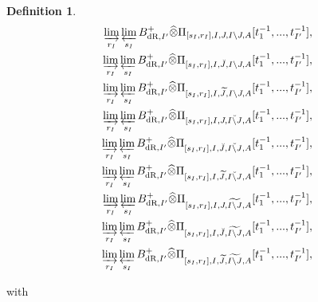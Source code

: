 \documentclass[12pt]{amsart}
\theoremstyle{definition}
\newtheorem{definition}[theorem]{Definition}
\numberwithin{equation}{section}
\begin{document}
\begin{definition}
\begin{align}
\varinjlim_{r_I}\varprojlim_{s_I} B^+_{\mathrm{dR},I'}	\widehat{\otimes}\Pi_{[s_I,r_I],I,J,I\backslash J,A}[t_1^{-1},...,t_{I'}^{-1}],\\	
\varinjlim_{r_I}\varprojlim_{s_I} B^+_{\mathrm{dR},I'}	\widehat{\otimes}\Pi_{[s_I,r_I],I,\breve{J},I\backslash J,A}[t_1^{-1},...,t_{I'}^{-1}],\\	
\varinjlim_{r_I}\varprojlim_{s_I} B^+_{\mathrm{dR},I'}	\widehat{\otimes}\Pi_{[s_I,r_I],I,\widetilde{J},I\backslash J,A}[t_1^{-1},...,t_{I'}^{-1}],\\
\varinjlim_{r_I}\varprojlim_{s_I} B^+_{\mathrm{dR},I'}	\widehat{\otimes}\Pi_{[s_I,r_I],I,J,\breve{I\backslash J},A}[t_1^{-1},...,t_{I'}^{-1}],\\	
\varinjlim_{r_I}\varprojlim_{s_I} B^+_{\mathrm{dR},I'}	\widehat{\otimes}\Pi_{[s_I,r_I],I,\breve{J},\breve{I\backslash J},A}[t_1^{-1},...,t_{I'}^{-1}],\\
\varinjlim_{r_I}\varprojlim_{s_I} B^+_{\mathrm{dR},I'}	\widehat{\otimes}\Pi_{[s_I,r_I],I,\widetilde{J},\breve{I\backslash J},A}[t_1^{-1},...,t_{I'}^{-1}],\\
\varinjlim_{r_I}\varprojlim_{s_I} B^+_{\mathrm{dR},I'}	\widehat{\otimes}\Pi_{[s_I,r_I],I,J,\widetilde{I\backslash J},A}[t_1^{-1},...,t_{I'}^{-1}],\\	
\varinjlim_{r_I}\varprojlim_{s_I} B^+_{\mathrm{dR},I'}	\widehat{\otimes}\Pi_{[s_I,r_I],I,\breve{J},\widetilde{I\backslash J},A}[t_1^{-1},...,t_{I'}^{-1}],\\
\varinjlim_{r_I}\varprojlim_{s_I} B^+_{\mathrm{dR},I'}	\widehat{\otimes}\Pi_{[s_I,r_I],I,\widetilde{J},\widetilde{I\backslash J},A}[t_1^{-1},...,t_{I'}^{-1}],
\end{align}

with 


\end{definition}
\end{document}
